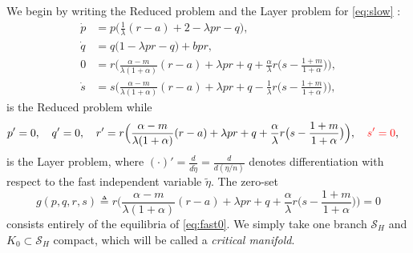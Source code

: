 \documentclass[a4paper,11pt]{article}
\def\red{\color{red}}
\theoremstyle{remark}
\begin{document}
We begin by writing the Reduced problem and the Layer problem for \eqref{eq:slow} :
\begin{equation}\label{eq:slow0} \tag{R}
 \begin{aligned}
 \dot{p} &=p\Big(\frac{1}{\lambda}({r}-a) + 2- \lambda p {r} -q\Big),\\%
 \dot{q} &=q\Big(1 -\lambda p {r} -q\Big) + b p {r},\\%
 0&=r\Big(\frac{\alpha-m}{\lambda(1+\alpha)}(r-a) + \lambda pr + q +\frac{\alpha}{\lambda}r\big(s- \frac{1+m}{1+\alpha}\big)\Big),\\
 \dot{s} &=s\Big(\frac{\alpha-m}{\lambda(1+\alpha)}({r}-a) + \lambda p{r} + q - \frac{1}{\lambda}{r}\big(s- \frac{1+m}{1+\alpha}\big)\Big),%
 \end{aligned}
\end{equation}
is the Reduced problem while
\begin{equation} \label{eq:fast0} 
 \begin{aligned}
 {p}' &=0, \quad {q}' =0, \quad {r}' =r\Big(\frac{\alpha-m}{\lambda(1+\alpha)}(r-a) + \lambda pr + q +\frac{\alpha}{\lambda}r\big(s- \frac{1+m}{1+\alpha}\big)\Big), {\red  \quad{s}' =0 },
 \end{aligned}
\end{equation}
is the Layer problem, where $(\cdot)'= \frac{d}{d\tilde{\eta}} = \frac{d}{d(\eta/n)}$ denotes differentiation with respect to the fast independent variable $\tilde{\eta}$. The zero-set
\begin{equation}
g(p,q,r,s)\triangleq r\Big(\frac{\alpha-m}{\lambda(1+\alpha)}(r-a) + \lambda pr + q +\frac{\alpha}{\lambda}r\big(s- \frac{1+m}{1+\alpha}\big)\Big)=0 \label{eq:zeroset} 
\end{equation}
consists entirely of the equilibria of \eqref{eq:fast0}. We simply take one branch $\mathcal{S}_H$ and {\red $K_0\subset\mathcal{S}_H$} compact, which will be called a {\it critical manifold}. 
\end{document}
